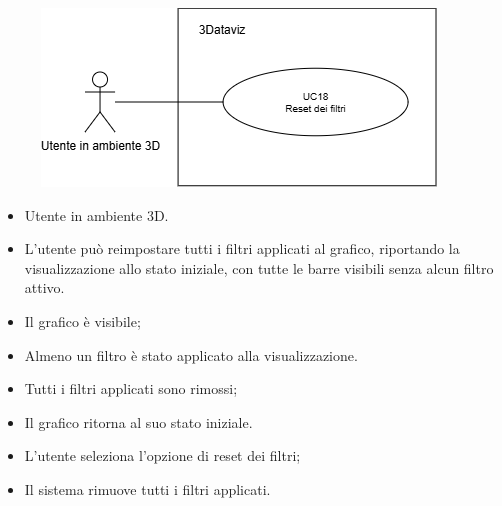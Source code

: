 \begin{figure}[H]\centering
    \includegraphics[scale=0.7]{template/images/UC18.png}
    \caption{}
\end{figure}
\UCdsc
{ %
    \begin{itemize}
        \item Utente in ambiente 3D.
    \end{itemize}
}
{ %
    \begin{itemize}
        \item L'utente può reimpostare tutti i filtri applicati al grafico, riportando la visualizzazione allo stato iniziale, con tutte le barre visibili senza alcun filtro attivo.
    \end{itemize}
}
{ %
    \begin{itemize}
        \item Il grafico è visibile;
        \item Almeno un filtro è stato applicato alla visualizzazione.
    \end{itemize}
}
{ %
    \begin{itemize}
        \item Tutti i filtri applicati sono rimossi;
        \item Il grafico ritorna al suo stato iniziale.
    \end{itemize}
}
{ %
    \begin{itemize}
        \item L'utente seleziona l'opzione di reset dei filtri;
        \item Il sistema rimuove tutti i filtri applicati.
    \end{itemize}
}


